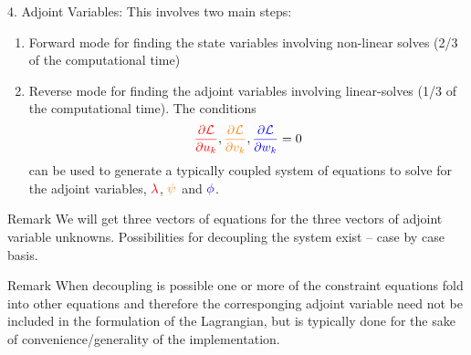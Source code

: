 \documentclass{beamer}
\newcommand{\pd}[2]{\dfrac{\partial #1}{\partial #2}}
\newenvironment{noheadline}{
    \setbeamertemplate{headline}{}
    \addtobeamertemplate{frametitle}{\vspace*{-1.5\baselineskip}}{}
}{}
\begin{document}
\begin{noheadline}
\begin{frame}[allowframebreaks]
{\begin{block}{4. Adjoint Variables:}
  This involves two main steps:
  \begin{enumerate}
  \item Forward mode for finding the state variables involving non-linear solves (2/3 of the
    computational time)
  \item Reverse mode for finding the adjoint variables involving
    linear-solves (1/3 of the computational time). The
    conditions $$\textcolor{red}{\pd{\cal{L}}{u_k}},
    \textcolor{orange}{\pd{\cal{L}}{v_k}},
    \textcolor{blue}{\pd{\cal{L}}{w_k}} = 0$$ can be used to generate
    a typically coupled system of equations to solve for the adjoint
    variables, $\textcolor{red}{\lambda}$, $\textcolor{orange}{\psi}$
    and $\textcolor{blue}{\phi}$. 
  \end{enumerate}

\end{block}

\begin{block}{Remark}
  We will get three vectors of equations for the three vectors of
  adjoint variable unknowns. Possibilities for decoupling the system
  exist -- case by case basis. 
\end{block}

\begin{block}{Remark}
  When decoupling is possible one or more of the
  constraint equations fold into other equations and therefore the
  corresponging adjoint variable need not be included in the
  formulation of the Lagrangian, but is typically done for the sake of
  convenience/generality of the implementation.
\end{block}

}
\end{frame}
\end{noheadline}
\end{document}
